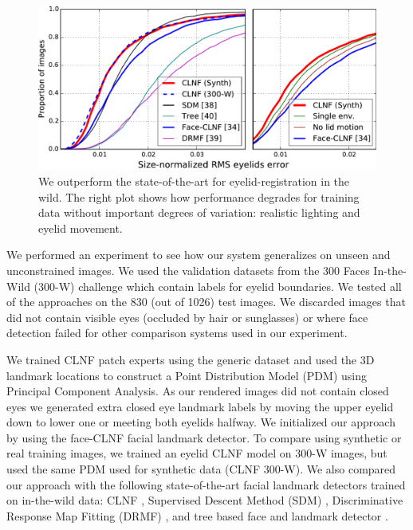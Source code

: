 \begin{figure}
    \centering
    \includegraphics[width=\columnwidth]{figs/CLNF_300W_experiment.pdf}
    \caption{We outperform the state-of-the-art for eyelid-registration in the wild. The right plot shows how performance degrades for training data without important degrees of variation: realistic lighting and eyelid movement.}
    \label{fig:clnf_results_wild}
\end{figure}

% 

We performed an experiment to see how our system generalizes on unseen and unconstrained images. We used the validation datasets from the 300 Faces In-the-Wild (300-W) challenge \cite{sagonas2013300} which contain labels for eyelid boundaries. We tested all of the approaches on the 830 (out of 1026) test images. We discarded images that did not contain visible eyes (occluded by hair or sunglasses) or where face detection failed for other comparison systems used in our experiment.

We trained CLNF patch experts using the generic \dataset dataset and used the 3D landmark locations to construct a Point Distribution Model (PDM) using Principal Component Analysis. 
As our rendered images did not contain closed eyes we generated extra closed eye landmark labels by moving the upper eyelid down to lower one or meeting both eyelids halfway.
We initialized our approach by using the face-CLNF \cite{baltrusaitis2013constrained} facial landmark detector.
To compare using synthetic or real training images, we trained an eyelid CLNF model on 300-W images, but used the same PDM used for synthetic data (CLNF 300-W).
We also compared our approach with the following state-of-the-art facial landmark detectors trained on in-the-wild data: CLNF \cite{baltrusaitis2013constrained}, Supervised Descent Method (SDM) \cite{Xiong2013sdm}, Discriminative Response Map Fitting (DRMF) \cite{Asthana2013drmf}, and tree based face and landmark detector \cite{Zhu2012tree}. 

